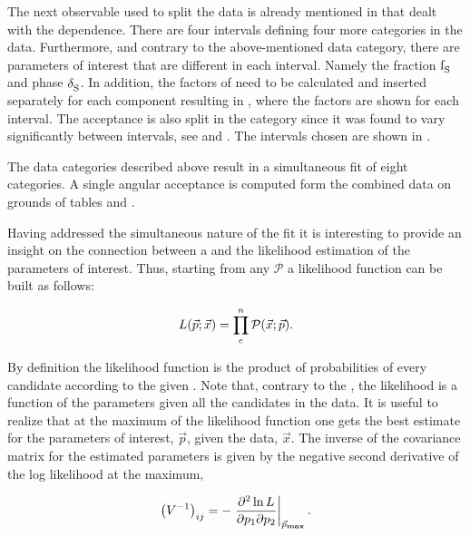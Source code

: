 The next observable used to split the data is already mentioned in  that dealt with the \mkpi dependence.
There are four \mkpi intervals defining four more categories in the data. Furthermore, and contrary to the above-mentioned data category, there
are parameters of interest that are different in each \mkpi interval. Namely the \swave fraction $\text{f}_{\text{S}}^{}$ and phase $\delta_{\text{S}}^{}$.
In addition, the \CSP factors of  need to be calculated and inserted separately for each component \pdf resulting in
, where the \CSP factors are shown for each \mkpi interval. The acceptance is also split in the \mkpi category
since it was found to vary significantly between \mkpi intervals, see  and .
The \mkpi intervals chosen are shown in .

The data categories described above result in a simultaneous fit of eight categories.
A single angular acceptance is computed form the combined \runone data on grounds of
tables  and .

Having addressed the simultaneous nature of the fit it is interesting to provide an insight on
the connection between a \pdf and the likelihood estimation of the parameters of interest.
Thus, starting from any \pdf $\mathcal{P}$ a likelihood function can be built as follows:

\begin{equation}
  \centering
L(\vec{p};\vec{x}) = \prod_e^n \mathcal{P}(\vec{x};\vec{p}).
\label{likelihood}
\end{equation}

\noindent By definition the likelihood function is the product of probabilities of every candidate according to the
 given \pdf. Note that, contrary to the \pdf, the likelihood is a function of the parameters given all the candidates in the data.
It is useful to realize that at the maximum of the likelihood function one gets the best estimate for the parameters of
interest, $\vec{p}$, given the data, $\vec{x}$. The inverse of the covariance matrix for the estimated parameters is given
by the negative second derivative of the log likelihood at the maximum,

\begin{equation}
  \centering
\left( V^{-1} \right)_{ij} = - \left. \frac{\partial^2\ln L}{\partial p_1 \partial p_2} \right|_{ \vec{p}_{\rm\bf max}}.
\label{covariance}
\end{equation}

